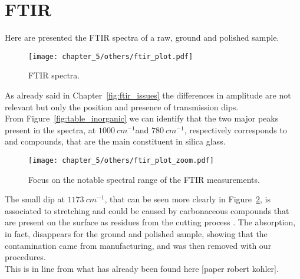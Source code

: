 \label{ch:experimental_results}

\section{FTIR}
\label{sec:ftir_results}
Here are presented the FTIR spectra of a raw, ground and polished sample. 

\begin{figure}[H]
    \centering
    \texttt{[image: chapter\_5/others/ftir\_plot.pdf]} 
    \vspace*{-30pt}
    \caption{FTIR spectra.}
    \label{fig:ftir_plot}
 \end{figure}

As already said in Chapter~\ref{fig:ftir_issues} the differences in amplitude are not relevant but only the position and presence of transmission dips. 
\\
From Figure~\ref{fig:table_inorganic} we can identify that the two major peaks present in the spectra, at $1000 \:cm^{-1} $and $780 \:cm^{-1}$, respectively corresponds to  and  compounds, that are the main constituent in silica glass.
\\
\begin{figure}[H]
    \centering
    \texttt{[image: chapter\_5/others/ftir\_plot\_zoom.pdf]} 
    \vspace*{-30pt}
    \caption{Focus on the notable spectral range of the FTIR measurements.}
    \label{fig:ftir_zoom_plot}
 \end{figure}

The small dip at $1173 \:cm^{-1}$, that can be seen more clearly in Figure~\ref{fig:ftir_zoom_plot}, is associated to  stretching \cite{chunliwang991FTIRFunctionalGroup2021} and could be caused by carbonaceous compounds that are present on the surface as residues from the cutting process \cite{kohlerQuantificationCarbonicContamination2021}. The absorption, in fact, disappears for the ground and polished sample, showing that the contamination came from manufacturing, and was then removed with our procedures.
\\
This is in line from what has already been found here [paper robert kohler].

